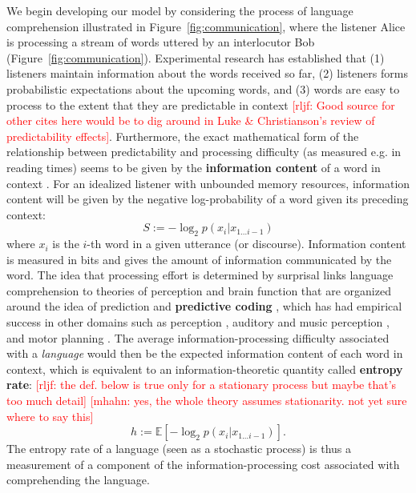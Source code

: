 \documentclass[12pt]{article}
\newcommand{\key}[1]{\textbf{#1}}
\newcommand{\rljf}[1]{\textcolor{Red}{[rljf: #1]}}
\newcommand{\mhahn}[1]{\textcolor{Red}{[mhahn: #1]}}
\begin{document}
We begin developing our model by considering the process of language comprehension illustrated in Figure~\ref{fig:communication}, where the listener Alice is processing a stream of words uttered by an interlocutor Bob (Figure~\ref{fig:communication}).
Experimental research has established that (1) listeners maintain information about the words received so far, (2) listeners forms probabilistic expectations about the upcoming words, and (3) words are easy to process to the extent that they are predictable in context \rljf{Good source for other cites here would be to dig around in Luke \& Christianson's review of predictability effects}. Furthermore, the exact mathematical form of the relationship between predictability and processing difficulty (as measured e.g. in reading times) seems to be given by the \key{information content} of a word in context \cite{hale2001probabilistic,levy2008expectation,smith2013effect}.
For an idealized listener with unbounded memory resources, information content will be given by the negative log-probability of a word given its preceding context:
\begin{equation}\label{eq:surp}
	S :=	-\log_2 p(x_i|x_{1...i-1})
\end{equation}
where $x_i$ is the $i$-th word in a given utterance (or discourse). Information content is measured in bits and gives the amount of information communicated by the word. The idea that processing effort is determined by surprisal links language comprehension to theories of perception and brain function that are organized around the idea of prediction and \key{predictive coding} \cite{friston2009predictive,friston2010free,clark2013whatever}, which has had empirical success in other domains such as perception \cite{egner2010expectation}, auditory and music perception \cite{agres2018information}, and motor planning \cite{wolpert2001motor}. The average information-processing difficulty associated with a \emph{language} would then be the expected information content of each word in context, which is equivalent to an information-theoretic quantity called \key{entropy rate}: \rljf{the def. below is true only for a stationary process but maybe that's too much detail} \mhahn{yes, the whole theory assumes stationarity. not yet sure where to say this}
\begin{equation}\label{eq:entropy-rate}
  h := \mathbb{E}[-\log_2 p(x_i|x_{1...i-1})].
\end{equation}
The entropy rate of a language (seen as a stochastic process) is thus a measurement of a component of the information-processing cost associated with comprehending the language.
\end{document}
